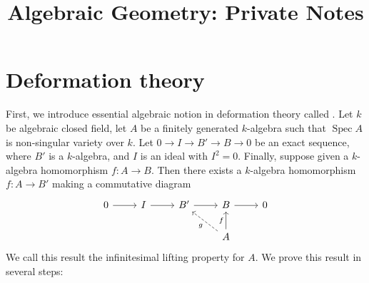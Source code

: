 \documentclass[a4paper]{amsart}
\title{Algebraic Geometry: Private Notes}
\theoremstyle{definition}
\theoremstyle{plain}
\DeclareMathOperator{\spec}{Spec}
\begin{document}
	\maketitle
\section{Deformation theory}
First, we introduce essential algebraic notion in deformation theory called .
	Let $k$ be algebraic closed field, let $A$ be a finitely generated $k$-algebra such that $\spec A$ is non-singular variety over $k$. Let $0 \to I \to B' \to B \to 0$ be an exact sequence, where $B'$ is a $k$-algebra, and $I$ is an ideal with $I^2=0$. Finally, suppose given a $k$-algebra homomorphism $f \colon A \to B$. Then there exists a $k$-algebra homomorphism $f \colon A \to B'$ making a commutative diagram
	\[
	\begin{tikzcd}
		0 \ar[r] &I \ar[r]& B' \ar[r] & B \ar[r]&  0\\
		  & & & A \ar[lu,"g",dashed] \ar[u,"f"]& 
	\end{tikzcd}
	\]
	We call this result the infinitesimal lifting property for $A$. We prove this result in several steps:
\end{document}
